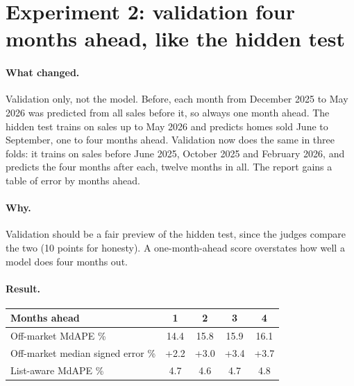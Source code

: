 \documentclass[11pt]{article}
\begin{document}
\section*{Experiment 2: validation four months ahead, like the hidden test}

\paragraph{What changed.}
Validation only, not the model. Before, each month from December 2025 to May 2026 was predicted
from all sales before it, so always one month ahead. The hidden test trains on sales up to May
2026 and predicts homes sold June to September, one to four months ahead. Validation now does the
same in three folds: it trains on sales before June 2025, October 2025 and February 2026, and
predicts the four months after each, twelve months in all. The report gains a table of error by
months ahead.

\paragraph{Why.}
Validation should be a fair preview of the hidden test, since the judges compare the two (10
points for honesty). A one-month-ahead score overstates how well a model does four months out.

\paragraph{Result.}

\begin{center}
\small

\end{center}

\begin{center}
\small
\begin{tabular}{lcccc}
\toprule
Months ahead & 1 & 2 & 3 & 4 \\
\midrule
Off-market MdAPE \% & 14.4 & 15.8 & 15.9 & 16.1 \\
Off-market median signed error \% & +2.2 & +3.0 & +3.4 & +3.7 \\
List-aware MdAPE \% & 4.7 & 4.6 & 4.7 & 4.8 \\
\bottomrule
\end{tabular}
\end{center}
\end{document}
